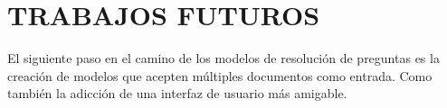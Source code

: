 \documentclass[../main.tex]{subfiles}
\begin{document}
\chapter{TRABAJOS FUTUROS}

El siguiente paso en el camino de los modelos de resolución de preguntas es la creación de modelos que acepten múltiples documentos como entrada. Como también la adicción de una interfaz de usuario más amigable.

\end{document}
